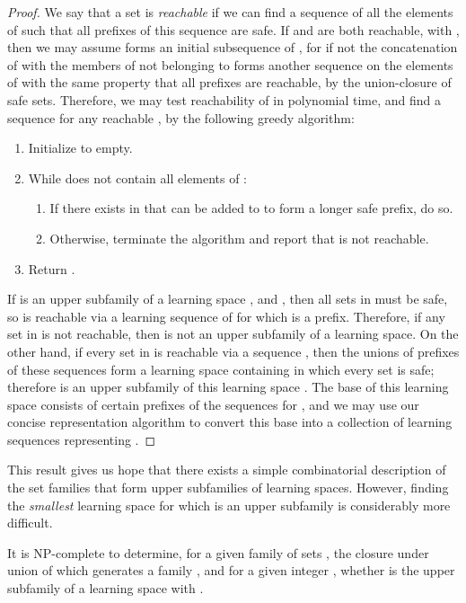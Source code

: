 \documentclass[11pt]{llncs}
\begin{document}
{\begin{proof}
We say that a set  is \emph{reachable} if we can find a sequence  of all the elements of  such that all prefixes of this sequence are safe. If  and  are both reachable, with , then we may assume  forms an initial subsequence of , for if not the concatenation of  with the members of  not belonging to  forms another sequence on the elements of  with the same property that all prefixes are reachable, by the union-closure of safe sets. Therefore, we may test reachability of  in polynomial time, and find a sequence  for any reachable , by the following greedy algorithm:

\begin{enumerate}
\item Initialize  to empty.
\item While  does not contain all elements of :
\begin{enumerate}
\item If there exists  in  that can be added to  to form a longer safe prefix, do so.
\item Otherwise, terminate the algorithm and report that  is not reachable.
\end{enumerate}
\item Return .
\end{enumerate}

If  is an upper subfamily of a learning space , and , then all sets in  must be safe, so  is reachable via a learning sequence of  for which  is a prefix. Therefore, if any set in  is not reachable, then  is not an upper subfamily of a learning space. On the other hand, if every set  in  is reachable via a sequence ,
then the unions of prefixes of these sequences form a learning space  containing  in which every set is safe; therefore  is an upper subfamily of this learning space .
The base of this learning space consists of certain prefixes of the sequences  for , and we may use our concise representation algorithm to convert this base into a collection of learning sequences representing .
\end{proof}

This result gives us hope that there exists a simple combinatorial description of the set families that form upper subfamilies of learning spaces.
However, finding the \emph{smallest} learning space for which  is an upper subfamily is considerably more difficult.

\begin{theorem}
It is NP-complete to determine, for a given family of sets ,  the closure under union of which generates a family , and for a given integer , whether  is the upper subfamily of a learning space  with .
\end{theorem}

}
\end{document}
